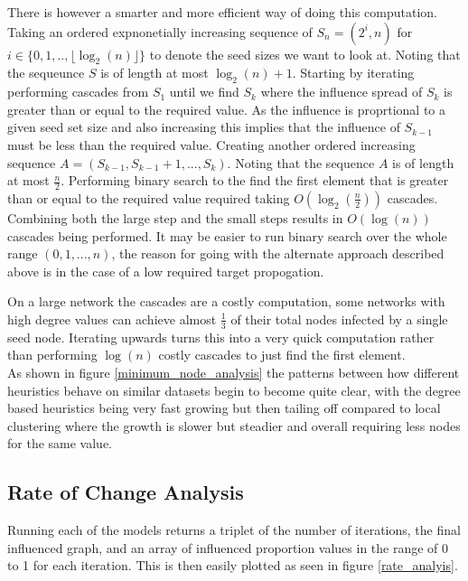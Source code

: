 \documentclass{article}
\begin{document}
There is however a smarter and more efficient way of doing this computation.
Taking an ordered expnonetially increasing sequence of $S_n = (2^i, n)$ for $i \in \{0, 1, ..,  \lfloor \log_2{(n)} \rfloor  \}$ to denote the seed sizes we want to look at.
Noting that the sequeunce $S$ is of length at most $\log_2(n) + 1$.
Starting by iterating performing cascades from $S_1$ until we find $S_k$ where the influence spread of $S_k$ is greater than or equal to the required value.
As the influence is proprtional to a given seed set size and also increasing this implies that the influence of $S_{k-1}$ must be less than the required value.
Creating another ordered increasing sequence $A = (S_{k-1}, S_{k-1} + 1, ..., S_{k})$.
Noting that the sequence $A$ is of length at most $\frac{n}{2}$.
Performing binary search to the find the first element that is greater than or equal to the required value required taking $O(\log_2(\frac{n}{2}))$ cascades.
Combining both the large step and the small steps results in $O(\log(n))$ cascades being performed.
It may be easier to run binary search over the whole range $(0, 1, ..., n)$, the reason for going with the alternate approach described above is in the case of a low required target propogation.

On a large network the cascades are a costly computation, some networks with high degree values can achieve almost $\frac{1}{3}$ of their total nodes infected by a single seed node.
Iterating upwards turns this into a very quick computation rather than performing $\log(n)$ costly cascades to just find the first element.
\\

As shown in figure \ref{minimum_node_analysis} the patterns between how different heuristics behave on similar datasets begin to become quite clear, with the degree based heuristics being very fast growing but then tailing off compared to local clustering where the growth is slower but steadier and overall requiring less nodes for the same value.

\subsection{Rate of Change Analysis}

Running each of the models returns a triplet of the number of iterations, the final influenced graph, and an array of influenced proportion values in the range of 0 to 1 for each iteration.
This is then easily plotted as seen in figure \ref{rate_analyis}.
\end{document}
